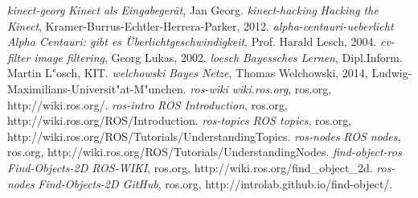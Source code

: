 	\clearpage


	\printbibliography

	
%	

\begin{thebibliography}{9}
 \emph{kinect-georg} \emph{Kinect als Eingabegerät}, Jan Georg.
 \emph{kinect-hacking} \emph{Hacking the Kinect}, Kramer-Burrus-Echtler-Herrera-Parker, 2012.
 \emph{alpha-centauri-ueberlicht} \emph{Alpha Centauri: gibt es Überlichtgeschwindigkeit}, Prof. Harald Lesch, 2004.
 \emph{cv-filter} \emph{image filtering}, Georg Lukas, 2002.
 \emph{loesch} \emph{Bayessches Lernen}, Dipl.Inform. Martin L"osch, KIT.
 \emph{welchowski} \emph{Bayes Netze}, Thomas Welchowski, 2014, Ludwig-Maximilians-Universit"at-M"unchen.
 \emph{ros-wiki} \emph{wiki.ros.org}, ros.org, http://wiki.ros.org/.
 \emph{ros-intro} \emph{ROS Introduction}, ros.org, http://wiki.ros.org/ROS/Introduction.
 \emph{ros-topics} \emph{ROS topics}, ros.org, http://wiki.ros.org/ROS/Tutorials/UnderstandingTopics.
 \emph{ros-nodes} \emph{ROS nodes}, ros.org, http://wiki.ros.org/ROS/Tutorials/UnderstandingNodes.
 \emph{find-object-ros} \emph{Find-Objects-2D ROS-WIKI}, ros.org, http://wiki.ros.org/find\_object\_2d.
 \emph{ros-nodes} \emph{Find-Objects-2D GitHub}, ros.org, http://introlab.github.io/find-object/.








\end{thebibliography}
	

